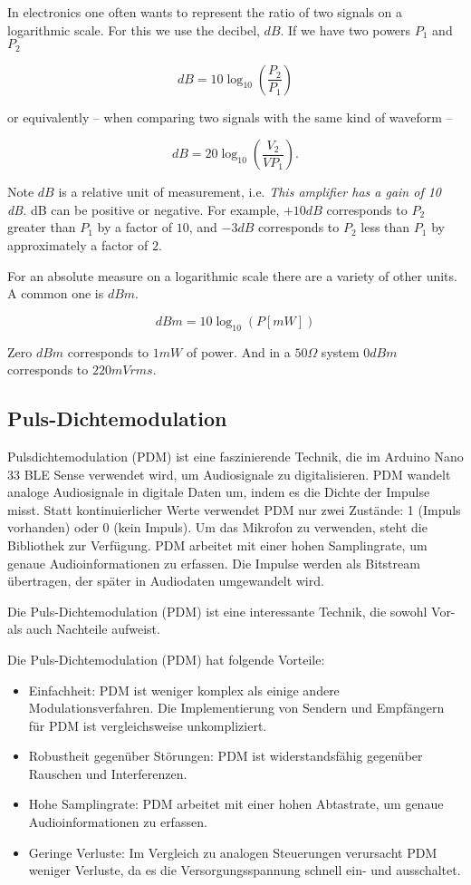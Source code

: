 In electronics one often wants to represent the ratio of two signals on a logarithmic scale. For this we use the decibel, $dB$. If we have two powers $P_1$ and $P_2$

$$dB = 10 \log_{10} \left(\frac{P_2}{P_1}\right)$$

or equivalently -- when comparing two signals with the same kind of waveform --

$$dB = 20 \log_{10} \left(\frac{V_2}{VP_1}\right).$$


Note $dB$ is a relative unit of measurement, i.e. \textit{This amplifier has a gain of 10 dB.} dB can be positive or 
negative. For example, $+10 dB$ corresponds to $P_2$ greater than $P_1$ by a factor of $10$, and $-3 dB$ 
corresponds to $P_2$ less than $P_1$ by approximately a factor of $2$. 

For an absolute measure on a logarithmic scale there are a variety of other units. A common one is $dBm$.

$$dBm = 10 \log_{10} (P [mW])$$

Zero $dBm$ corresponds to $1 mW$ of power. And in a $50 \Omega$ system $0 dBm$ corresponds to $220 mVrms$.

\subsection{Puls-Dichtemodulation}

Pulsdichtemodulation (PDM) ist eine faszinierende Technik, die im Arduino Nano 33 BLE Sense verwendet wird, um Audiosignale zu digitalisieren. PDM wandelt analoge Audiosignale in digitale Daten um, indem es die Dichte der Impulse misst.
Statt kontinuierlicher Werte verwendet PDM nur zwei Zustände: 1 (Impuls vorhanden) oder 0 (kein Impuls).  Um das Mikrofon zu verwenden, steht die Bibliothek  zur Verfügung. PDM arbeitet mit einer hohen Samplingrate, um genaue Audioinformationen zu erfassen. Die Impulse werden als Bitstream übertragen, der später in Audiodaten umgewandelt wird. 

Die Puls-Dichtemodulation (PDM) ist eine interessante Technik, die sowohl Vor- als auch Nachteile aufweist. 

Die Puls-Dichtemodulation (PDM) hat folgende Vorteile:


\begin{itemize}
    \item Einfachheit: PDM ist weniger komplex als einige andere Modulationsverfahren. Die Implementierung von Sendern und Empfängern für PDM ist vergleichsweise unkompliziert.
    \item Robustheit gegenüber Störungen: PDM ist widerstandsfähig gegenüber Rauschen und Interferenzen.
    \item Hohe Samplingrate: PDM arbeitet mit einer hohen Abtastrate, um genaue Audioinformationen zu erfassen.
    \item Geringe Verluste: Im Vergleich zu analogen Steuerungen verursacht PDM weniger Verluste, da es die Versorgungsspannung schnell ein- und ausschaltet.
\end{itemize}

